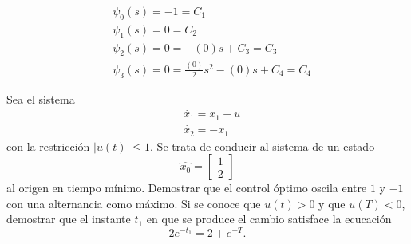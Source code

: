 \documentclass{ejercicios}
\begin{document}
\begin{solution}
  \begin{align*}
  &\psi_0(s) = -1 = C_1\\
  &\psi_1(s) = 0 = C_2\\
  &\psi_2(s) = 0 = -(0)s + C_3 = C_3\\
  &\psi_3(s) = 0 = \frac{(0)}{2}s^2 - (0)s + C_4 = C_4
  \end{align*}
\end{solution}

\begin{exercise}
  Sea el sistema
  \begin{align*}
    &\dot{x_1} = x_1 + u \\
    &\dot{x_2} = -x_1
  \end{align*}
  con la restricción $\lvert u(t)\rvert\leq 1$. Se trata de conducir al sistema de un estado
  \[\hat{x_0} = \begin{bmatrix} 1 \\ 2 \end{bmatrix}\]
  al origen en tiempo mínimo. Demostrar que el control óptimo oscila entre $1$ y $-1$ con una alternancia como máximo.
  Si se conoce que $u(t)>0$ y que $u(T) < 0$, demostrar que el instante $t_1$ en que se produce el cambio satisface la ecucación
  \[2e^{-t_1} = 2 + e^{-T}.\]
\end{exercise}
\end{document}
